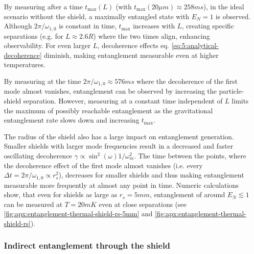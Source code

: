 By measuring after a time $t_\mathrm{max}(L)$ (with $t_\mathrm{max}(20\si{\mu m}) \approx 258\si{ms}$), in the ideal scenario without the shield, a maximally entangled state with $E_N = 1$ is observed.
Although $2\pi/\omega_{1,0}$ is constant in time, $t_\mathrm{max}$ increases with $L$, creating specific separations (e.g. for $L\approx 2.6R$) where the two times align, enhancing observability.
For even larger $L$, decoherence effects eq. \eqref{eq:5:analytical-decoherence} diminish, making entanglement measurable even at higher temperatures.

By measuring at the time $2\pi/\omega_{1,0} \approx 576\si{ms}$ where the decoherence of the first mode almost vanishes, entanglement can be observed by increasing the particle-shield separation.
However, measuring at a constant time independent of $L$ limits the maximum of possibly reachable entanglement as the gravitational entanglement rate slows down and increasing $t_\mathrm{max}$.

The radius of the shield also has a large impact on entanglement generation. Smaller shields with larger mode frequencies result in a decreased and faster oscillating decoherence $\gamma \propto \sin^2(\omega) 1/\omega_m^2$.
The time between the points, where the decoherence effect of the first mode almost vanishes (i.e. every $\Delta t = 2\pi/\omega_{1,0} \propto r_s^2$), decreases for smaller shields and thus making entanglement measurable more frequently at almost any point in time.
Numeric calculations show, that even for shields as large as $r_s = 5\si{mm}$, entanglement of around $E_N \lesssim 1$ can be measured at $T = 20\si{mK}$ even at close separations (see \cref{fig:apx:entanglement-thermal-shield-rs-5mm} and \cref{fig:apx:entanglement-thermal-shield-rs}).

\subsubsection*{Indirect entanglement through the shield}


